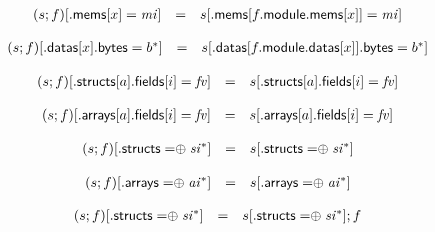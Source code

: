 $$
\begin{array}[t]{@{}lcl@{}l@{}}
(s ; f){}[{.}\mathsf{mems}{}[x] = {\mathit{mi}}] & = & s{}[{.}\mathsf{mems}{}[f{.}\mathsf{module}{.}\mathsf{mems}{}[x]] = {\mathit{mi}}] \\
\end{array}
$$

$$
\begin{array}[t]{@{}lcl@{}l@{}}
(s ; f){}[{.}\mathsf{datas}{}[x]{.}\mathsf{bytes} = {b^\ast}] & = & s{}[{.}\mathsf{datas}{}[f{.}\mathsf{module}{.}\mathsf{datas}{}[x]]{.}\mathsf{bytes} = {b^\ast}] \\
\end{array}
$$

$$
\begin{array}[t]{@{}lcl@{}l@{}}
(s ; f){}[{.}\mathsf{structs}{}[a]{.}\mathsf{fields}{}[i] = {\mathit{fv}}] & = & s{}[{.}\mathsf{structs}{}[a]{.}\mathsf{fields}{}[i] = {\mathit{fv}}] \\
\end{array}
$$

$$
\begin{array}[t]{@{}lcl@{}l@{}}
(s ; f){}[{.}\mathsf{arrays}{}[a]{.}\mathsf{fields}{}[i] = {\mathit{fv}}] & = & s{}[{.}\mathsf{arrays}{}[a]{.}\mathsf{fields}{}[i] = {\mathit{fv}}] \\
\end{array}
$$

\vspace{1ex}

$$
\begin{array}[t]{@{}lcl@{}l@{}}
(s ; f){}[{.}\mathsf{structs} \mathrel{{=}{\oplus}} {{\mathit{si}}^\ast}] & = & s{}[{.}\mathsf{structs} \mathrel{{=}{\oplus}} {{\mathit{si}}^\ast}] \\
\end{array}
$$

$$
\begin{array}[t]{@{}lcl@{}l@{}}
(s ; f){}[{.}\mathsf{arrays} \mathrel{{=}{\oplus}} {{\mathit{ai}}^\ast}] & = & s{}[{.}\mathsf{arrays} \mathrel{{=}{\oplus}} {{\mathit{ai}}^\ast}] \\
\end{array}
$$

$$
\begin{array}[t]{@{}lcl@{}l@{}}
(s ; f){}[{.}\mathsf{structs} \mathrel{{=}{\oplus}} {{\mathit{si}}^\ast}] & = & s{}[{.}\mathsf{structs} \mathrel{{=}{\oplus}} {{\mathit{si}}^\ast}] ; f \\
\end{array}
$$

